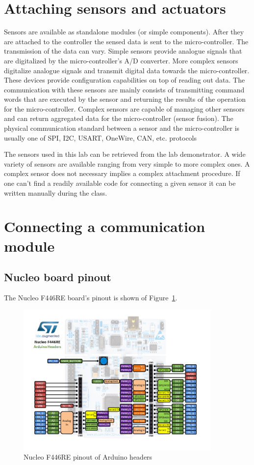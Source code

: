 \documentclass[a4paper]{article}
\begin{document}
\section{Attaching sensors and actuators}

Sensors are available as standalone modules (or simple components). After they are attached to the controller the
sensed data is sent to the micro-controller. The transmission of the data can vary. Simple sensors provide analogue
signals that are digitalized by the micro-controller's A/D converter. More complex sensors digitalize analogue signals
and transmit digital data towards the micro-controller. These devices provide configuration capabilities on top of
reading out data. The communication with these sensors are mainly consists of transmitting command words that are
executed by the sensor and returning the results of the operation for the micro-controller. Complex sensors are capable
of managing other sensors and can return aggregated data for the micro-controller (sensor fusion). The physical
communication standard between a sensor and the micro-controller is usually one of SPI, I2C, USART, OneWire, CAN, etc. protocols

The sensors used in this lab can be retrieved from the lab demonstrator. A wide variety of sensors are available
ranging from very simple to more complex ones. A complex sensor does not necessary implies a complex attachment
procedure. If one can't find a readily available code for connecting a given sensor it can be written manually during the class.

\section{Connecting a communication module}

\subsection{Nucleo board pinout}

The Nucleo F446RE board's pinout is shown of Figure~\ref{fig:nucleo-pinout}.

\begin{figure}[H]
    \centering
    \includegraphics[width=0.9\textwidth]{figures/nucleo-pinout.png}
    \caption{Nucleo F446RE pinout of Arduino headers}
    \label{fig:nucleo-pinout}
\end{figure}
\end{document}
